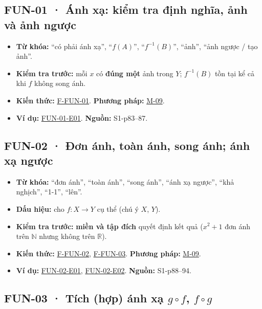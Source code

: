 \documentclass[
  10pt,
  twoside,openany]{book}
\providecommand{\tightlist}{%
  \setlength{\itemsep}{0pt}\setlength{\parskip}{0pt}}
\begin{document}
\hypertarget{FUN-01}{%
\subsection{FUN-01 · Ánh xạ: kiểm tra định nghĩa, ảnh và ảnh
ngược}\label{FUN-01}}

\begin{itemize}
\tightlist
\item
  \textbf{Từ khóa:} ``có phải ánh xạ'', ``\(f(A)\)'', ``\(f^{-1}(B)\)'',
  ``ảnh'', ``ảnh ngược / tạo ảnh''.
\item
  \textbf{Kiểm tra trước:} mỗi \(x\) có \textbf{đúng một} ảnh trong
  \(Y\); \(f^{-1}(B)\) tồn tại kể cả khi \(f\) không song ánh.
\item
  \textbf{Kiến thức:} \protect\hyperlink{F-FUN-01}{F-FUN-01}.
  \textbf{Phương pháp:} \protect\hyperlink{M-09}{M-09}.
\item
  \textbf{Ví dụ:} \protect\hyperlink{FUN-01-E01}{FUN-01-E01}.
  \textbf{Nguồn:} S1-p83--87.
\end{itemize}

\hypertarget{FUN-02}{%
\subsection{FUN-02 · Đơn ánh, toàn ánh, song ánh; ánh xạ
ngược}\label{FUN-02}}

\begin{itemize}
\tightlist
\item
  \textbf{Từ khóa:} ``đơn ánh'', ``toàn ánh'', ``song ánh'', ``ánh xạ
  ngược'', ``khả nghịch'', ``1-1'', ``lên''.
\item
  \textbf{Dấu hiệu:} cho \(f:X\to Y\) cụ thể (chú ý \(X\), \(Y\)).
\item
  \textbf{Kiểm tra trước:} \textbf{miền và tập đích} quyết định kết quả
  (\(x^2+1\) đơn ánh trên \(\mathbb N\) nhưng không trên \(\mathbb R\)).
\item
  \textbf{Kiến thức:} \protect\hyperlink{F-FUN-02}{F-FUN-02},
  \protect\hyperlink{F-FUN-03}{F-FUN-03}. \textbf{Phương pháp:}
  \protect\hyperlink{M-09}{M-09}.
\item
  \textbf{Ví dụ:} \protect\hyperlink{FUN-02-E01}{FUN-02-E01},
  \protect\hyperlink{FUN-02-E02}{FUN-02-E02}. \textbf{Nguồn:}
  S1-p88--94.
\end{itemize}

\hypertarget{FUN-03}{%
\subsection{\texorpdfstring{FUN-03 · Tích (hợp) ánh xạ \(g\circ f\),
\(f\circ g\)}{FUN-03 · Tích (hợp) ánh xạ g\textbackslash circ f, f\textbackslash circ g}}\label{FUN-03}}
\end{document}
